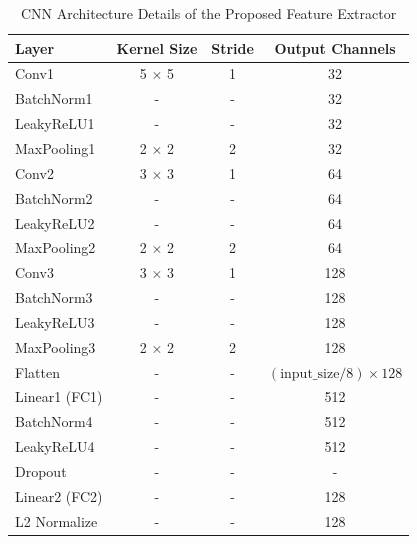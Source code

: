 \begin{table}[h!]
\centering
\caption{CNN Architecture Details of the Proposed Feature Extractor}
\begin{tabular}{|l|c|c|c|}
\hline
\textbf{Layer} & \textbf{Kernel Size} & \textbf{Stride} & \textbf{Output Channels} \\
\hline
Conv1          & 5 $\times$ 5         & 1               & 32                        \\
BatchNorm1     & -                   & -               & 32                        \\
LeakyReLU1     & -                   & -               & 32                        \\
MaxPooling1    & 2 $\times$ 2        & 2               & 32                        \\
\hline
Conv2          & 3 $\times$ 3         & 1               & 64                        \\
BatchNorm2     & -                   & -               & 64                        \\
LeakyReLU2     & -                   & -               & 64                        \\
MaxPooling2    & 2 $\times$ 2         & 2               & 64                        \\
\hline
Conv3          & 3 $\times$ 3         & 1               & 128                       \\
BatchNorm3     & -                   & -               & 128                       \\
LeakyReLU3     & -                   & -               & 128                       \\
MaxPooling3    & 2 $\times$ 2         & 2               & 128                       \\
\hline
Flatten        & -                   & -               & $(\text{input\_size} / 8) \times 128$ \\
Linear1 (FC1)  & -                   & -               & 512                        \\
BatchNorm4     & -                   & -               & 512                        \\
LeakyReLU4     & -                   & -               & 512                        \\
Dropout        & -                   & -               & -                          \\
Linear2 (FC2)  & -                   & -               & 128                        \\
L2 Normalize   & -                   & -               & 128                        \\
\hline
\end{tabular}
\label{tab:cnn_architecture1}
\end{table}
